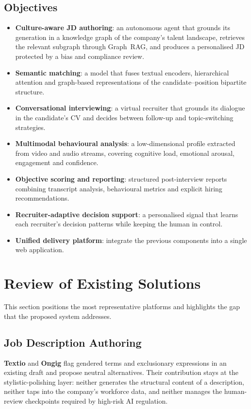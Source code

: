\subsection{Objectives}
\begin{itemize}
    \item \textbf{Culture-aware JD authoring}: an autonomous agent that
    grounds its generation in a knowledge graph of the company's talent
    landscape, retrieves the relevant subgraph through Graph~RAG, and
    produces a personalised JD protected by a bias and compliance review.
    \item \textbf{Semantic matching}: a model that fuses textual encoders,
    hierarchical attention and graph-based representations of the
    candidate--position bipartite structure.
    \item \textbf{Conversational interviewing}: a virtual recruiter that
    grounds its dialogue in the candidate's CV and decides between
    follow-up and topic-switching strategies.
    \item \textbf{Multimodal behavioural analysis}: a low-dimensional profile
    extracted from video and audio streams, covering cognitive load,
    emotional arousal, engagement and confidence.
    \item \textbf{Objective scoring and reporting}: structured
    post-interview reports combining transcript analysis, behavioural
    metrics and explicit hiring recommendations.
    \item \textbf{Recruiter-adaptive decision support}: a personalised signal
    that learns each recruiter's decision patterns while keeping the human
    in control.
    \item \textbf{Unified delivery platform}: integrate the previous
    components into a single web application.
\end{itemize}

\section{Review of Existing Solutions}
This section positions the most representative platforms and highlights the
gap that the proposed system addresses.

\subsection{Job Description Authoring}
\textbf{Textio} and \textbf{Ongig} flag gendered terms and exclusionary
expressions in an existing draft and propose neutral alternatives. Their
contribution stays at the stylistic-polishing layer: neither generates the
structural content of a description, neither taps into the company's
workforce data, and neither manages the human-review checkpoints required
by high-risk AI regulation.

